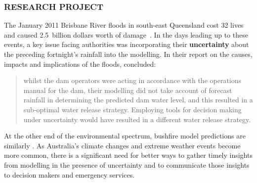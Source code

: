 \documentclass[a4paper,fontsize=13pt]{scrartcl}
\begin{document}
\subsubsection*{RESEARCH PROJECT}

The January 2011 Brisbane River floods in south-east Queensland cost
32 lives and caused 2.5~billion dollars worth of
damage~\parencite{vandenhonert_2011_2011}. In the days leading up to
these events, a key issue facing authorities was incorporating their
\textbf{uncertainty} about the preceding fortnight's rainfall into the
modelling. In their report on the causes, impacts and implications of
the floods, \textcite[p1170]{vandenhonert_2011_2011} concluded:
\blockquote{whilst the dam operators were acting in accordance with
  the operations manual for the dam, their modelling did not take
  account of forecast rainfall in determining the predicted dam water
  level, and this resulted in a sub-optimal water release strategy.
  Employing tools for decision making under uncertainty would have
  resulted in a different water release strategy.} 
At the other end of
the environmental spectrum, bushfire model predictions are similarly
. As Australia's climate changes and extreme weather
events become more common, there is a significant need for better ways to
gather timely insights from modelling in the presence of uncertainty and to communicate those insights to 
decision makers and emergency services.
\end{document}
